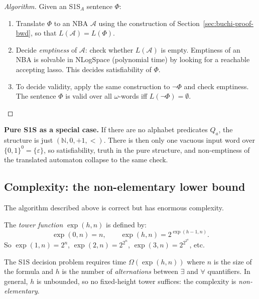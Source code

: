 \begin{proof}[Algorithm]
Given an S1S$_A$ sentence $\Phi$:
\begin{enumerate}
  \item Translate $\Phi$ to an NBA $\mathcal{A}$ using the construction
        of Section~\ref{sec:buchi-proof-bwd}, so that
        $L(\mathcal{A}) = L(\Phi)$.
  \item Decide \emph{emptiness} of $\mathcal{A}$: check whether $L(\mathcal{A})$
        is empty.  Emptiness of an NBA is solvable in NLogSpace (polynomial
        time) by looking for a reachable accepting lasso.
        This decides satisfiability of $\Phi$.
  \item To decide validity, apply the same construction to $\neg\Phi$ and
        check emptiness.  The sentence $\Phi$ is valid over all
        $\omega$-words iff $L(\neg\Phi)=\emptyset$.
\end{enumerate}
\end{proof}

\medskip\noindent
\textbf{Pure S1S as a special case.}  If there are no alphabet predicates
$Q_a$, the structure is just $(\mathbb{N},0,+1,<)$.  There is then only one
vacuous input word over $\{0,1\}^0=\{\varepsilon\}$, so satisfiability,
truth in the pure structure, and non-emptiness of the translated automaton
collapse to the same check.

\subsection{Complexity: the non-elementary lower bound}

The algorithm described above is correct but has enormous complexity.

\begin{definition}
The \emph{tower function} $\exp(h, n)$ is defined by:
\[
  \exp(0, n) = n, \qquad \exp(h, n) = 2^{\exp(h-1, n)}.
\]
So $\exp(1,n) = 2^n$, $\exp(2,n) = 2^{2^n}$, $\exp(3,n) = 2^{2^{2^n}}$,
etc.
\end{definition}

\begin{theorem}[Stockmeyer]
The S1S decision problem requires time $\Omega(\exp(h, n))$
where $n$ is the size of the formula and $h$ is the number of
\emph{alternations} between $\exists$ and $\forall$ quantifiers.
In general, $h$ is unbounded, so no fixed-height tower suffices:
the complexity is \emph{non-elementary}.
\end{theorem}

